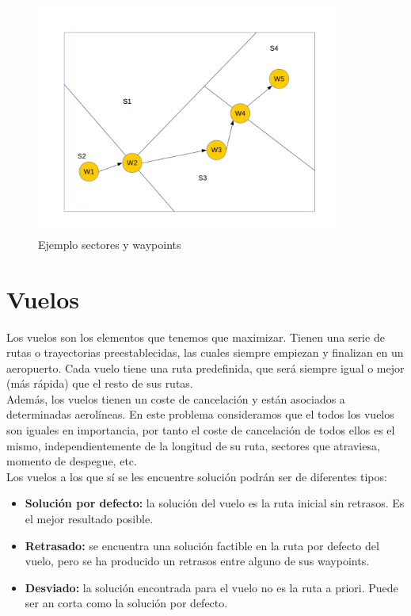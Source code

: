 \begin{figure}[H]
	\begin{center}
		\centering
		\includegraphics[width=0.9\textwidth]{./imagenes/descripcion_problema/sectoresYWaypoints.jpg}
		\caption{Ejemplo sectores y waypoints}
		\label{fig: Ejemplo sectores y waypoints}
	\end{center}
\end{figure}

\section{Vuelos}
Los vuelos son los elementos que tenemos que maximizar. Tienen una serie de rutas o trayectorias preestablecidas, las cuales siempre empiezan y finalizan en un aeropuerto. Cada vuelo tiene una ruta predefinida, que será siempre igual o mejor (más rápida) que el resto de sus rutas.\\
Además, los vuelos tienen un coste de cancelación y están asociados a determinadas aerolíneas. En este problema consideramos que el todos los vuelos son iguales en importancia, por tanto el coste de cancelación de todos ellos es el mismo, independientemente de la longitud de su ruta, sectores que atraviesa, momento de despegue, etc.\\

Los vuelos a los que sí se les encuentre solución podrán ser  de diferentes tipos:
\begin{itemize}
	\item \textbf{Solución por defecto:} la solución del vuelo es la ruta inicial sin retrasos. Es el mejor resultado posible.
	\item \textbf{Retrasado:} se encuentra una solución factible en la ruta por defecto del vuelo, pero se ha producido un retrasos entre alguno de sus waypoints.
	\item \textbf{Desviado:} la solución encontrada para el vuelo no es la ruta a priori. Puede ser an corta como la solución por defecto.
\end{itemize}


